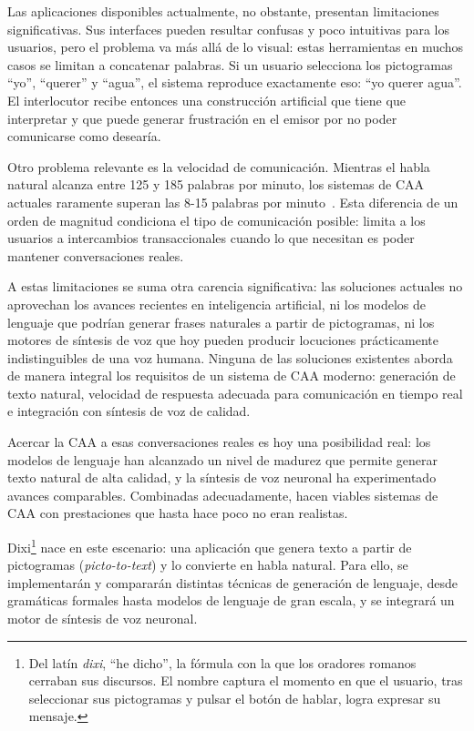 Las aplicaciones disponibles actualmente, no obstante, presentan limitaciones significativas. Sus interfaces pueden resultar confusas y poco intuitivas para los usuarios, pero el problema va más allá de lo visual: estas herramientas en muchos casos se limitan a concatenar palabras. Si un usuario selecciona los pictogramas ``yo'', ``querer'' y ``agua'', el sistema reproduce exactamente eso: ``yo querer agua''. El interlocutor recibe entonces una construcción artificial que tiene que interpretar y que puede generar frustración en el emisor por no poder comunicarse como desearía.

Otro problema relevante es la velocidad de comunicación. Mientras el habla natural alcanza entre 125 y 185 palabras por minuto, los sistemas de CAA actuales raramente superan las 8-15 palabras por minuto~\cite{elsahar2019aac}. Esta diferencia de un orden de magnitud condiciona el tipo de comunicación posible: limita a los usuarios a intercambios transaccionales cuando lo que necesitan es poder mantener conversaciones reales.

A estas limitaciones se suma otra carencia significativa: las soluciones actuales no aprovechan los avances recientes en inteligencia artificial, ni los modelos de lenguaje que podrían generar frases naturales a partir de pictogramas, ni los motores de síntesis de voz que hoy pueden producir locuciones prácticamente indistinguibles de una voz humana. Ninguna de las soluciones existentes aborda de manera integral los requisitos de un sistema de CAA moderno: generación de texto natural, velocidad de respuesta adecuada para comunicación en tiempo real e integración con síntesis de voz de calidad.

Acercar la CAA a esas conversaciones reales es hoy una posibilidad real: los modelos de lenguaje han alcanzado un nivel de madurez que permite generar texto natural de alta calidad, y la síntesis de voz neuronal ha experimentado avances comparables. Combinadas adecuadamente, hacen viables sistemas de CAA con prestaciones que hasta hace poco no eran realistas.

Dixi\footnote{Del latín \textit{dixi}, ``he dicho'', la fórmula con la que los oradores romanos cerraban sus discursos. El nombre captura el momento en que el usuario, tras seleccionar sus pictogramas y pulsar el botón de hablar, logra expresar su mensaje.} nace en este escenario: una aplicación que genera texto a partir de pictogramas (\textit{picto-to-text}) y lo convierte en habla natural. Para ello, se implementarán y compararán distintas técnicas de generación de lenguaje, desde gramáticas formales hasta modelos de lenguaje de gran escala, y se integrará un motor de síntesis de voz neuronal.

